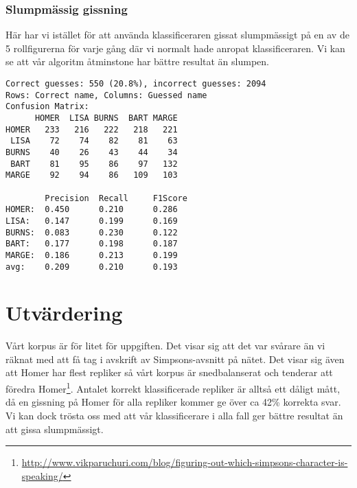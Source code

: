 \documentclass[a4paper]{article}
\begin{document}
\subsubsection{Slumpmässig gissning}
Här har vi istället för att använda klassificeraren gissat slumpmässigt på en av
de 5 rollfigurerna för varje gång där vi normalt hade anropat klassificeraren.
Vi kan se att vår algoritm åtminstone har bättre resultat än slumpen.
\begin{verbatim}
Correct guesses: 550 (20.8%), incorrect guesses: 2094
Rows: Correct name, Columns: Guessed name
Confusion Matrix:
      HOMER  LISA BURNS  BART MARGE 
HOMER   233   216   222   218   221 
 LISA    72    74    82    81    63 
BURNS    40    26    43    44    34 
 BART    81    95    86    97   132 
MARGE    92    94    86   109   103 

        Precision  Recall     F1Score    
HOMER:  0.450      0.210      0.286      
LISA:   0.147      0.199      0.169      
BURNS:  0.083      0.230      0.122      
BART:   0.177      0.198      0.187      
MARGE:  0.186      0.213      0.199      
avg:    0.209      0.210      0.193      
\end{verbatim}


\section{Utvärdering}
Vårt korpus är för litet för uppgiften. Det visar sig att det var svårare än vi
räknat med att få tag i avskrift av Simpsons-avsnitt på nätet. Det visar sig
även att Homer har flest repliker så vårt korpus är snedbalanserat och tenderar
att föredra
Homer\footnote{\url{http://www.vikparuchuri.com/blog/figuring-out-which-simpsons-character-is-speaking/}}.
Antalet korrekt klassificerade repliker är alltså ett dåligt mått, då en
gissning på Homer för alla repliker kommer ge över ca 42\% korrekta svar. Vi kan
dock trösta oss med att vår klassificerare i alla fall ger bättre resultat än
att gissa slumpmässigt.


\end{document}
